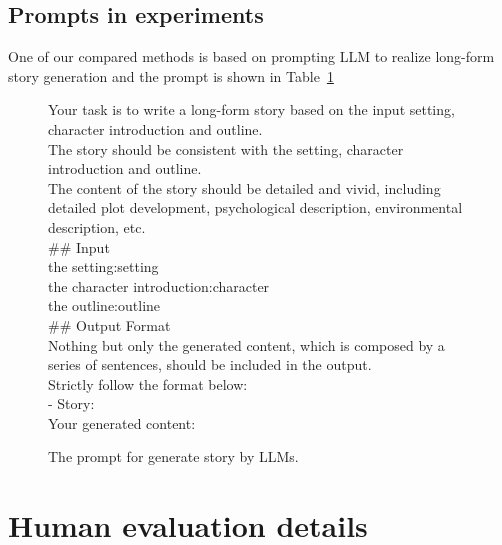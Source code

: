 \subsection{Prompts in experiments}
\label{sup:llm prompt}
One of our compared methods is based on prompting LLM to realize long-form story generation and the prompt is shown in Table~\ref{tab:exp_pronmpt}
\begin{figure}[htbp]
\centering
\begin{tcolorbox}
Your task is to write a long-form story based on the input setting, character introduction and outline.\\
    The story should be consistent with the setting, character introduction and outline.\\
    The content of the story should be detailed and vivid, including detailed plot development, psychological description, environmental description, etc.\\
    \#\# Input\\
    the setting:{setting}\\
    the character introduction:{character}\\
    the outline:{outline}\\
    
    \#\# Output Format \\
    Nothing but only the generated content, which is composed by a series of sentences, should be included in the output.\\
    Strictly follow the format below:\\
    - Story: \\
    Your generated content:
\end{tcolorbox}
\caption{The prompt for generate story by LLMs.}
\label{tab:exp_pronmpt}
\end{figure}

%
%
%
%
\section{Human evaluation details}
\label{sup:human evaluate}

